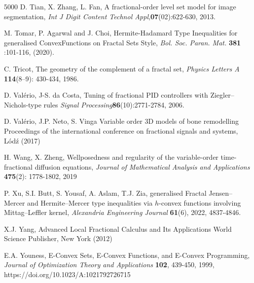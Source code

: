 \documentclass[10pt]{article}
\begin{document}
\begin{thebibliography}{5000}
 D. Tian, X. Zhang, L. Fan,
A fractional-order level set model for image segmentation,
{\it Int J Digit Content Technol Appl},{\bf 07}(02):622-630, 2013. 

 M. Tomar, P. Agarwal and J. Choi, Hermite-Hadamard Type Inequalities for generalised ConvexFunctions on Fractal Sets Style, {\it Bol. Soc. Paran. Mat.} {\bf 381} :101-116, (2020).

 C. Tricot, The geometry of the complement of a fractal set, {\it Physics Letters A}
{\bf114}(8–9): 430-434, 1986.



D. Valério, J-S. da Costa,  Tuning of fractional PID controllers with Ziegler–Nichols-type rules {\it Signal Processing}{\bf86}(10):2771-2784, 2006.

 D. Valério, J.P. Neto, S. Vinga
Variable order 3D models of bone remodelling
Proceedings of the international conference on fractional signals and systems, Lódź (2017)

 H. Wang, X. Zheng, Wellposedness and regularity of the variable-order time-fractional diffusion equations, {\it Journal of Mathematical Analysis and Applications} {\bf475}(2): 1778-1802, 2019




 P. Xu, S.I. Butt, S. Yousaf, A. Aslam, T.J. Zia, generalised Fractal Jensen–Mercer and Hermite–Mercer type inequalities via $h$-convex functions involving Mittag–Leffler kernel, {\it Alexandria Engineering Journal} {\bf 61}(6), 2022, 4837-4846.


 X.J. Yang, Advanced Local Fractional Calculus and Its Applications
World Science Publisher, New York (2012)

 E.A. Youness,  E-Convex Sets, E-Convex Functions, and E-Convex Programming, {\it Journal of Optimization Theory and Applications} {\bf102}, 439-450, 1999, https://doi.org/10.1023/A:1021792726715







\end{thebibliography}
\end{document}
